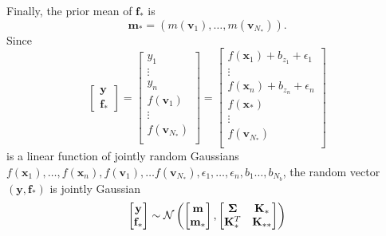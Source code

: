 Finally, the prior mean of $\mathbf{f}_*$ is 
\begin{equation*}
    \mathbf{m}_* = (m(\mathbf{v}_1), \ldots, m(\mathbf{v}_{N_*})).
\end{equation*}
Since
\begin{equation*}
    \begin{bmatrix}
        \mathbf{y} \\ \mathbf{f}_{*}
    \end{bmatrix}
    =
    \begin{bmatrix}
        y_1 \\
        \vdots \\
        y_n \\
        f(\mathbf{v}_1) \\
        \vdots \\
        f(\mathbf{v}_{N_{*}}) \\
    \end{bmatrix}
    =
    \begin{bmatrix}
        f(\mathbf{x}_1) + b_{z_1} + \epsilon_1 \\
        \vdots \\
        f(\mathbf{x}_n) + b_{z_n} + \epsilon_n \\
        f(\mathbf{x}_*) \\
        \vdots \\
        f(\mathbf{v}_{N_{*}}) \\
    \end{bmatrix}
\end{equation*}
is a linear function of jointly random Gaussians $f(\mathbf{x}_1), \ldots, f(\mathbf{x}_n), f(\mathbf{v}_1), \ldots f(\mathbf{v}_{N_*}), \epsilon_1, \ldots, \epsilon_n, b_1 \ldots, b_{N_b}$,
the random vector $(\mathbf{y}, \mathbf{f}_*)$ is jointly Gaussian
\begin{equation*}
    \begin{bmatrix}
        \mathbf{y} \\
        \mathbf{f}_*
    \end{bmatrix}
    \sim
    \mathcal{N}\left(
    \begin{bmatrix}
            \mathbf{m} \\
            \mathbf{m}_*
        \end{bmatrix}
    ,
    \begin{bmatrix}
            \boldsymbol{\Sigma} & \mathbf{K}_* \\
            \mathbf{K}_*^T & \mathbf{K}_{* *}
        \end{bmatrix}
    \right)
\end{equation*}
